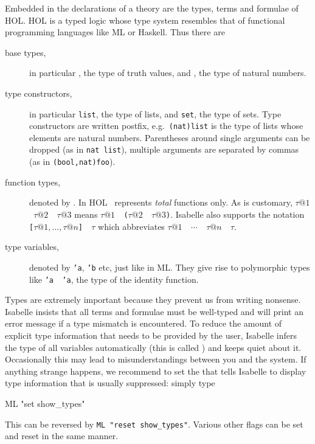 Embedded in the declarations of a theory are the types, terms and formulae of
HOL. HOL is a typed logic whose type system resembles that of functional
programming languages like ML or Haskell. Thus there are
\begin{description}
\item[base types,] in particular , the type of truth values,
and , the type of natural numbers.
\item[type constructors,] in particular \texttt{list}, the type of
lists, and \texttt{set}, the type of sets. Type constructors are written
postfix, e.g.\ \texttt{(nat)list} is the type of lists whose elements are
natural numbers. Parentheses around single arguments can be dropped (as in
\texttt{nat list}), multiple arguments are separated by commas (as in
\texttt{(bool,nat)foo}).
\item[function types,] denoted by \isasymFun{}.
  In HOL \isasymFun\ represents {\em total} functions only. As is customary,
  \texttt{$\tau@1$ \isasymFun~$\tau@2$ \isasymFun~$\tau@3$} means
  \texttt{$\tau@1$ \isasymFun~($\tau@2$ \isasymFun~$\tau@3$)}. Isabelle also
  supports the notation \texttt{[$\tau@1,\dots,\tau@n$] \isasymFun~$\tau$}
  which abbreviates \texttt{$\tau@1$ \isasymFun~$\cdots$ \isasymFun~$\tau@n$
    \isasymFun~$\tau$}.
\item[type variables,] denoted by \texttt{'a}, \texttt{'b} etc, just like in
ML. They give rise to polymorphic types like \texttt{'a \isasymFun~'a}, the
type of the identity function.
\end{description}
\begin{warn}
  Types are extremely important because they prevent us from writing
  nonsense.  Isabelle insists that all terms and formulae must be well-typed
  and will print an error message if a type mismatch is encountered. To
  reduce the amount of explicit type information that needs to be provided by
  the user, Isabelle infers the type of all variables automatically (this is
  called ) and keeps quiet about it. Occasionally
  this may lead to misunderstandings between you and the system. If anything
  strange happens, we recommend to set the 
   that tells Isabelle to display type information
  that is usually suppressed: simply type
\begin{ttbox}
ML "set show_types"
\end{ttbox}

\noindent
This can be reversed by \texttt{ML "reset show_types"}. Various other flags
can be set and reset in the same manner.
\end{warn}


